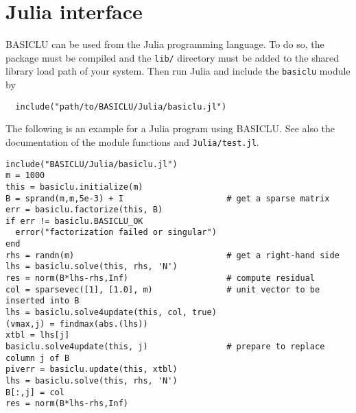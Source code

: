 \documentclass{article}
\newcommand{\ct}{\texttt}
\begin{document}
\section{Julia interface}
BASICLU can be used from the Julia programming language. To do so, the package
must be compiled and the \ct{lib/} directory must be added to the shared library
load path of your system. Then run Julia and include the \ct{basiclu} module by
\begin{verbatim}
  include("path/to/BASICLU/Julia/basiclu.jl")
\end{verbatim}
The following is an example for a Julia program using BASICLU. See also the
documentation of the module functions and \ct{Julia/test.jl}.
{\footnotesize
\begin{verbatim}
include("BASICLU/Julia/basiclu.jl")
m = 1000
this = basiclu.initialize(m)
B = sprand(m,m,5e-3) + I                     # get a sparse matrix
err = basiclu.factorize(this, B)
if err != basiclu.BASICLU_OK
  error("factorization failed or singular")
end
rhs = randn(m)                               # get a right-hand side
lhs = basiclu.solve(this, rhs, 'N')
res = norm(B*lhs-rhs,Inf)                    # compute residual
col = sparsevec([1], [1.0], m)               # unit vector to be inserted into B
lhs = basiclu.solve4update(this, col, true)
(vmax,j) = findmax(abs.(lhs))
xtbl = lhs[j]
basiclu.solve4update(this, j)                # prepare to replace column j of B
piverr = basiclu.update(this, xtbl)
lhs = basiclu.solve(this, rhs, 'N')
B[:,j] = col
res = norm(B*lhs-rhs,Inf)
\end{verbatim}
}
\end{document}
